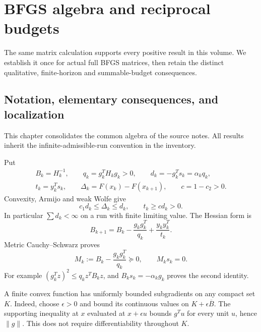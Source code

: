 \chapter{BFGS algebra and reciprocal budgets}\label{comp:M}\label{M:chapter}
\renewcommand{\ModuleTag}{2}
The same matrix calculation supports every positive result in this volume. We establish it once for actual full BFGS matrices, then retain the distinct qualitative, finite-horizon and summable-budget consequences.


\section{Notation, elementary consequences, and localization}
\label{M:notation}
This chapter consolidates the common algebra of the source notes. All results inherit the infinite-admissible-run convention in the inventory.

Put
\[
 \begin{gathered}
 B_k=H_k^{-1},\qquad q_k=g_k^TH_kg_k>0,\qquad d_k=-g_k^Ts_k=\alpha_kq_k,\\
 t_k=y_k^Ts_k,\qquad\Delta_k=F(x_k)-F(x_{k+1}),\qquad c=1-c_2>0.
 \end{gathered}
\]
Convexity, Armijo and weak Wolfe give
\begin{equation}\label{M:basic}
 c_1d_k\le\Delta_k\le d_k,\qquad t_k\ge c d_k>0.
\end{equation}
In particular $\sum d_k<\infty$ on a run with finite limiting value. The Hessian form is
\begin{equation}\label{M:hessian}
 B_{k+1}=B_k-\frac{g_kg_k^T}{q_k}+\frac{y_ky_k^T}{t_k}.
\end{equation}
Metric Cauchy--Schwarz proves
\begin{equation}\label{M:annihilation}
 M_k:=B_k-\frac{g_kg_k^T}{q_k}\succeq0,\qquad M_ks_k=0.
\end{equation}
For example $(g_k^Tz)^2\le q_k z^TB_kz$, and $B_ks_k=-\alpha_kg_k$ proves the second identity.

A finite convex function has uniformly bounded subgradients on any compact set $K$. Indeed, choose $\epsilon>0$ and bound its continuous values on $K+\epsilon\overline B$. The supporting inequality at $x$ evaluated at $x+\epsilon u$ bounds $g^Tu$ for every unit $u$, hence $\|g\|$. This does not require differentiability throughout $K$.

